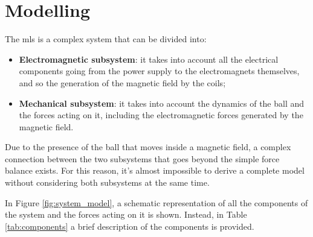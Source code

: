 \section{Modelling}
\label{sec:modelling}

The \acrshort{mls} is a complex system that can be divided into:

\begin{itemize}
    \item \textbf{Electromagnetic subsystem}: it takes into account all the electrical components going from the power supply to the electromagnets themselves, and so the generation of the magnetic field by the coils;
    \item \textbf{Mechanical subsystem}: it takes into account the dynamics of the ball and the forces acting on it, including the electromagnetic forces generated by the magnetic field.
\end{itemize}

Due to the presence of the ball that moves inside a magnetic field, a complex connection between the two subsystems that goes beyond the simple force balance exists.
For this reason, it's almost impossible to derive a complete model without considering both subsystems at the same time.

In Figure \ref{fig:system_model}, a schematic representation of all the components of the system and the forces acting on it is shown.
Instead, in Table \ref{tab:components} a brief description of the components is provided.

